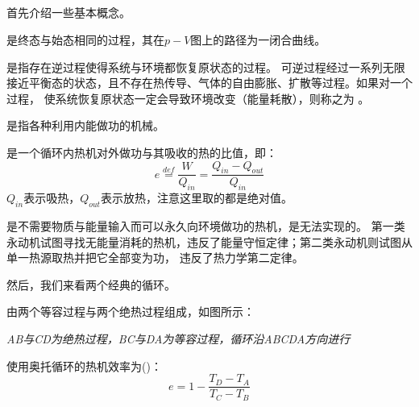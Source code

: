         \subsection[热机]{}
            首先介绍一些基本概念。
            \begin{Itemize}
                \item {} 是终态与始态相同的过程，其在$p-V$图上的路径为一闭合曲线。
                \item {} 是指存在逆过程使得系统与环境都恢复原状态的过程。
                可逆过程经过一系列无限接近平衡态的状态，且不存在热传导、气体的自由膨胀、扩散等过程。如果对一个过程，
                使系统恢复原状态一定会导致环境改变（能量耗散），则称之为 。
                \item {} 是指各种利用内能做功的机械。
            \end{Itemize}
            \begin{Itemize}
                \item {} 是一个循环内热机对外做功与其吸收的热的比值，即：
                \begin{equation}
                    e \overset{def}{=} \frac{W}{Q_{in}} = \frac{Q_{in}-Q_{out}}{Q_{in}}
                    \nonumber
                \end{equation}
                $Q_{in}$表示吸热，$Q_{out}$表示放热，注意这里取的都是绝对值。
                \item {} 是不需要物质与能量输入而可以永久向环境做功的热机，是无法实现的。
                第一类永动机试图寻找无能量消耗的热机，违反了能量守恒定律；第二类永动机则试图从单一热源取热并把它全部变为功，
                违反了热力学第二定律。
            \end{Itemize}
            
            然后，我们来看两个经典的循环。

             由两个等容过程与两个绝热过程组成，如图所示：
            \vspace{1ex}
            \begin{center}
            	\em AB与CD为绝热过程，BC与DA为等容过程，循环沿ABCDA方向进行
            \end{center}
            
            使用奥托循环的热机效率为()：
            \begin{equation}
                e = 1 - \frac{T_{D} - T_{A}}{T_{C} - T_{B}}
                \nonumber
            \end{equation}
            
